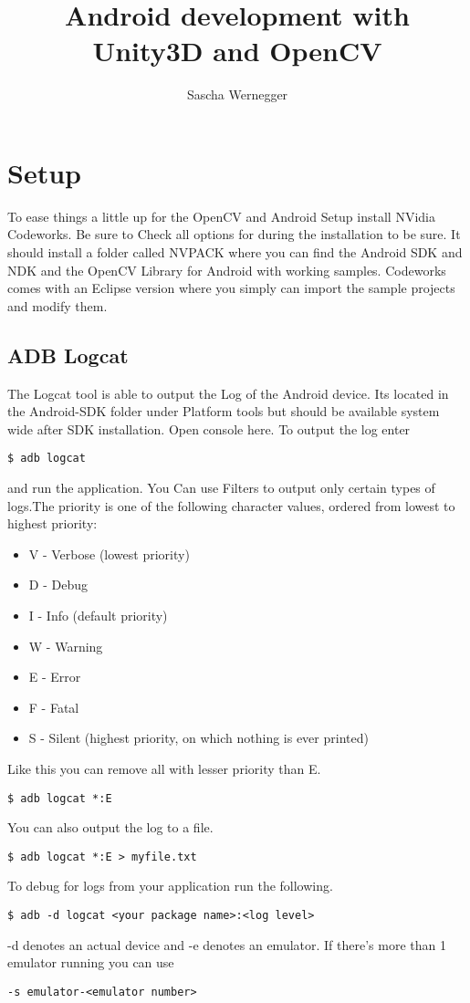 \documentclass[10pt,a4paper]{article}
\author{Sascha Wernegger}
\begin{document}
\title{Android development with Unity3D and OpenCV}
\maketitle
\section{Setup}
To ease things a little up for the OpenCV and Android Setup install NVidia Codeworks. Be sure to Check all options for during the installation to be sure. It should install a folder called NVPACK where you can find the Android SDK and NDK and the OpenCV Library for Android with working samples. Codeworks comes with an Eclipse version where you simply can import the sample projects and modify them.

\subsection{ADB Logcat}
The Logcat tool is able to output the Log of the Android device. Its located in the Android-SDK  folder under Platform tools but should be available system wide after SDK installation. Open console here. To output the log enter 
\begin{lstlisting}
$ adb logcat
\end{lstlisting}
and run the application. You Can use Filters to output only certain types of logs.The priority is one of the following character values, ordered from lowest to highest priority:
\begin{itemize}
	\item[] V - Verbose (lowest priority)
	\item[] D - Debug
	\item[] I - Info (default priority)
	\item[] W - Warning
	\item[] E - Error
	\item[] F - Fatal
	\item[] S - Silent (highest priority, on which nothing is ever printed)
\end{itemize}
Like this you can remove all with lesser priority than E.
\begin{lstlisting}
$ adb logcat *:E
\end{lstlisting}
You can also output the log to a file.
\begin{lstlisting}
$ adb logcat *:E > myfile.txt
\end{lstlisting}
To debug for logs from your application run the following.
\begin{lstlisting}
$ adb -d logcat <your package name>:<log level>
\end{lstlisting}
-d denotes an actual device and -e denotes an emulator. If there's more than 1 emulator running you can use 
\begin{lstlisting}
-s emulator-<emulator number> 
\end{lstlisting}
\end{document}
